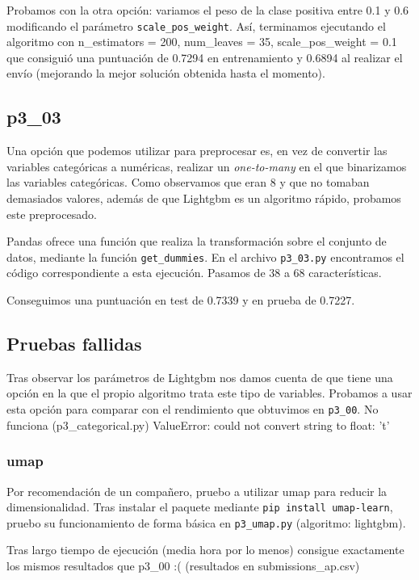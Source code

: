 \documentclass[a4paper, 20pt]{article}
\begin{document}
Probamos con la otra opción: variamos el peso de la clase positiva entre 0.1 y 0.6 modificando el parámetro \texttt{scale\_pos\_weight}.
Así, terminamos ejecutando el algoritmo con {\ttfamily n\_estimators = 200, num\_leaves = 35, scale\_pos\_weight = 0.1} que consiguió una puntuación de 0.7294 en entrenamiento y 0.6894 al realizar el envío (mejorando la mejor solución obtenida hasta el momento).

\subsection{p3\_03}
Una opción que podemos utilizar para preprocesar es, en vez de convertir las variables categóricas a numéricas, realizar un \textit{one-to-many} en el que binarizamos las variables categóricas. Como observamos que eran 8 y que no tomaban demasiados valores, además de que Lightgbm es un algoritmo rápido, probamos este preprocesado. 

Pandas ofrece una función que realiza la transformación sobre el conjunto de datos, mediante la función \texttt{get\_dummies}. En el archivo \texttt{p3\_03.py} encontramos el código correspondiente a esta ejecución. Pasamos de 38 a 68 características.

Conseguimos una puntuación en test de 0.7339 y en prueba de 0.7227.

\subsection{Pruebas fallidas}
Tras observar los parámetros de Lightgbm nos damos cuenta de que tiene una opción en la que el propio algoritmo trata este tipo de variables. Probamos a usar esta opción para comparar con el rendimiento que obtuvimos en \texttt{p3\_00}.
 No funciona (p3\_categorical.py)
 ValueError: could not convert string to float: 't'
\subsubsection{umap}
Por recomendación de un compañero, pruebo a utilizar umap para reducir la dimensionalidad. Tras instalar el paquete mediante \texttt{pip install umap-learn}, pruebo su funcionamiento de forma básica en \texttt{p3\_umap.py} (algoritmo: lightgbm).

Tras largo tiempo de ejecución (media hora por lo menos) consigue exactamente los mismos resultados que p3\_00 :( (resultados en submissions\_ap.csv)
 
\printbibliography
\end{document}
